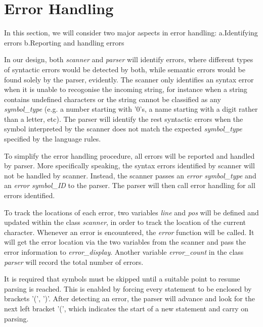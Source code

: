 \documentclass[12pt]{article}
\def\n{\noindent}
\begin{document}
\section{Error Handling}
In this section, we will consider two major aspects in error handling:
\n a.Identifying errors
\n b.Reporting and handling errors

\vspace{0.3cm}

\n In our design, both \textit{scanner} and \textit{parser} will identify errors, where different types of syntactic errors would be detected by both, while semantic errors would be found solely by the parser, evidently. The scanner only identifies an syntax error when it is unable to recogonise the incoming string, for instance when a string contains undefined characters or the string cannot be classified as any \emph{symbol\_type} (e.g. a number starting with '0's, a name starting with a digit rather than a letter, etc). The parser will identify the rest syntactic errors when the symbol interpreted by the scanner does not match the expected \emph{symbol\_type} specified by the language rules.

\vspace{0.3cm}

\n To simplify the error handling procedure, all errors will be reported and handled by parser. More specifically speaking, the syntax errors identified by scanner will not be handled by scanner. Instead, the scanner passes an \emph{error symbol\_type} and an \emph{error symbol\_ID} to the parser. The parser will then call error handling for all errors identified.

\vspace{0.3cm}

\n To track the locations of each error, two variables \textit{line} and \textit{pos} will be defined and updated within the class \textit{scanner}, in order to track the location of the current character. Whenever an error is encountered, the \textit{error} function will be called. It will get the error location via the two variables from the scanner and pass the error information to \textit{error\_display}. Another variable \emph{error\_count} in the class \textit{parser} will record the total number of errors.


\vspace{0.3cm}

\n It is required that symbols must be skipped until a suitable point to resume
parsing is reached. This is enabled by forcing every statement to be enclosed by
brackets '(', ')'. After detecting an error, the parser will advance and look
for the next left bracket '(', which indicates the start of a new statement and
carry on parsing.
\end{document}
